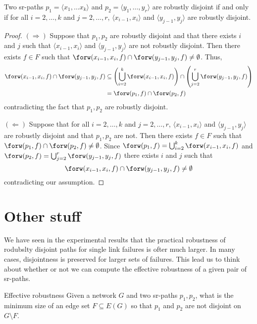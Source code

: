 \begin{theorem}
Two sr-paths $p_1 = \langle x_1, \ldots x_k \rangle$ and $p_2 = \langle y_1, \ldots, y_r \rangle$ are robustly disjoint if and only if
for all $i = 2, \ldots, k$ and $j = 2, \ldots, r$, $\langle x_{i - 1}, x_i \rangle$ and $\langle y_{j - 1}, y_j \rangle$ are robustly disjoint.
\end{theorem}

\begin{proof}
$(\Rightarrow)$ Suppose that $p_1, p_2$ are robustly disjoint and that there exists $i$ and $j$ such that $\langle x_{i - 1}, x_i \rangle$ and
$\langle y_{j - 1}, y_j \rangle$ are not robustly disjoint. Then there exists $f \in F$ such that 
$\forw(x_{i - 1}, x_i, f) \cap \forw(y_{j - 1}, y_j, f) \neq \emptyset$.
Thus,
\begin{align*}
\forw(x_{i - 1}, x_i, f) \cap \forw(y_{j - 1}, y_j, f) & \subseteq 
\left( \bigcup_{i = 2}^k \forw(x_{i - 1}, x_i, f) \right) \cap \left( \bigcup_{j = 2}^r \forw(y_{j - 1}, y_j, f) \right) \\
& = \forw(p_1, f) \cap \forw(p_2, f) 
\end{align*}
contradicting the fact that $p_1, p_2$ are robustly disjoint.

$(\Leftarrow)$ Suppose that for all $i = 2, \ldots, k$ and $j = 2, \ldots, r$,  $\langle x_{i - 1}, x_i \rangle$ and $\langle y_{j - 1}, y_j \rangle$
are robustly disjoint and that $p_1, p_2$ are not. Then there exists $f \in F$ such that $\forw(p_1, f) \cap \forw(p_2, f) \neq \emptyset$. Since 
$\forw(p_1, f) = \bigcup_{i = 2}^k \forw(x_{i - 1}, x_i, f)$ and $\forw(p_2, f) = \bigcup_{j = 2}^r \forw(y_{j - 1}, y_j, f)$ there exists $i$ and $j$
such that 
$$
\forw(x_{i - 1}, x_i, f) \cap \forw(y_{j - 1}, y_j, f) \neq \emptyset
$$ 
contradicting our assumption.
\end{proof}

\section{Other stuff}

We have seen in the experimental results that the practical robustness of rodubslty disjoint paths for single link failures
is ofter much larger. In many cases, disjointness is preserved for larger sets of failures. This lead us to think about whether
or not we can compute the effective robustness of a given pair of sr-paths.

\begin{problem}{Effective robustness}
\label{prob:eff-rob}
Given a network $G$ and two sr-paths $p_1, p_2$, what is the minimum size of an edge set $F \subseteq E(G)$
so that $p_1$ and $p_2$ are not disjoint on $G \setminus F$.
\end{problem}

